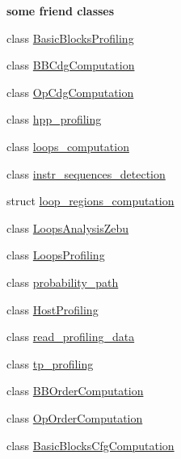 \begin{Indent}\textbf{ some friend classes}\par
\begin{DoxyCompactItemize}
\item 
class \hyperlink{classFunctionBehavior_a87b11674e05d76b8663d6e3ac122cd8f}{Basic\+Blocks\+Profiling}
\item 
class \hyperlink{classFunctionBehavior_a82c0e02129e86a885810ca26a4fad5a2}{B\+B\+Cdg\+Computation}
\item 
class \hyperlink{classFunctionBehavior_a2c6c15184a2b102e18966b26919d9196}{Op\+Cdg\+Computation}
\item 
class \hyperlink{classFunctionBehavior_a6a6bc099881e3be4e8f9841667053c6f}{hpp\+\_\+profiling}
\item 
class \hyperlink{classFunctionBehavior_abf6a0e3c2eb34bcbfdeb905b863c2f3a}{loops\+\_\+computation}
\item 
class \hyperlink{classFunctionBehavior_a49b3112cc2ba3c1509a338ff8d892a0c}{instr\+\_\+sequences\+\_\+detection}
\item 
struct \hyperlink{classFunctionBehavior_a645d4168a0dfd07373d5bc8517c2e8d6}{loop\+\_\+regions\+\_\+computation}
\item 
class \hyperlink{classFunctionBehavior_aa6518cdd209493b978849dc43dbb17a2}{Loops\+Analysis\+Zebu}
\item 
class \hyperlink{classFunctionBehavior_aa0b8ea11ea1cf633a99d0bc8c7e03cbf}{Loops\+Profiling}
\item 
class \hyperlink{classFunctionBehavior_a36ba7cf3661cd9e03d109c40b4873394}{probability\+\_\+path}
\item 
class \hyperlink{classFunctionBehavior_aeae4f76935b7ccae2766532d8c77d884}{Host\+Profiling}
\item 
class \hyperlink{classFunctionBehavior_af65e69c76a0365b3c9c52d28ec2a8661}{read\+\_\+profiling\+\_\+data}
\item 
class \hyperlink{classFunctionBehavior_abd013dc605abd765cac41400b089c8b5}{tp\+\_\+profiling}
\item 
class \hyperlink{classFunctionBehavior_aa95302d8fdfd18693fca66c5e622d925}{B\+B\+Order\+Computation}
\item 
class \hyperlink{classFunctionBehavior_a747a030002d28122725936c3f71972b8}{Op\+Order\+Computation}
\item 
class \hyperlink{classFunctionBehavior_a751d28e1fb777a7572350101dc320be8}{Basic\+Blocks\+Cfg\+Computation}
\end{DoxyCompactItemize}
\end{Indent}


